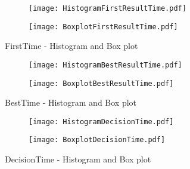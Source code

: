 \begin{figure}[htbp] %
\begin{center} 
\begin{subfigure} 
\centering
\texttt{[image: HistogramFirstResultTime.pdf]}
\end{subfigure} 
\begin{subfigure} 
\centering
  \texttt{[image: BoxplotFirstResultTime.pdf]}
\end{subfigure}
  \caption{FirstTime - Histogram and Box plot}
    \label{DistributionFirstTime} 
\end{center}
\end{figure}
\begin{figure}[htbp] %
\begin{center} 
\begin{subfigure} 
\centering
\texttt{[image: HistogramBestResultTime.pdf]}
\end{subfigure} 
\begin{subfigure} 
\centering
  \texttt{[image: BoxplotBestResultTime.pdf]}
\end{subfigure}
  \caption{BestTime - Histogram and Box plot}
    \label{DistributionBestTime} 
\end{center}
\end{figure}

\begin{figure}[htbp] %
\begin{center} 
\begin{subfigure} 
\centering
\texttt{[image: HistogramDecisionTime.pdf]}
\end{subfigure} 
\begin{subfigure} 
\centering
  \texttt{[image: BoxplotDecisionTime.pdf]}
\end{subfigure}
  \caption{DecisionTime - Histogram and Box plot}
    \label{DistributionDecisionTime} 
\end{center}
\end{figure}

